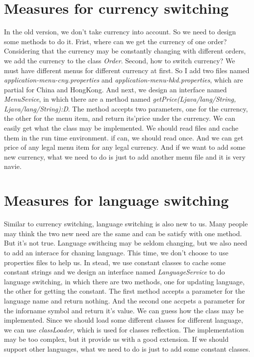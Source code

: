 \documentclass[a4paper]{report}
\begin{document}
\section{Measures for currency switching}
\par In the old version, we don't take currency into account. So we need to design some methods to do it. Frist, where can we get the currency of one order? Considering that the currency may be constantly changing with different orders, we add the currency to the class \emph{Order}. Second, how to switch currency? We must have different menus for different currency at first. So I add two files named \emph{application-menu-cny.properties} and \emph{application-menu-hkd.properties}, which are partial for China and HongKong. And next, we design an interface named \emph{MenuSevice}, in which there are a method named \emph{getPrice(Ljava/lang/String, Ljava/lang/String):D}. The method accepts two parameters, one for the currency, the other for the menu item, and return its'price under the currency. We can easily get what the class may be implemented. We should read files and cache them in the run time environment. if can, we should read once. And we can get price of any legal menu item for any legal currency. And if we want to add some new currency, what we need to do is just to add another menu file and it is very navie.
\section{Measures for language switching}
\par Similar to currency switching, language switching is also new to us. Many people may think the two new need are the same and can be satisfy with one method. But it's not true. Language swithcing may be seldom changing, but we also need to add an interace for chaning language. This time, we don't choose to use properties files to help us. In stead, we use constant classes to cache some constant strings and we design an interface named \emph{LanguageService} to do language switching, in which there are two methods, one for updating language, the other for getting the constant. The first method accepts a parameter for the language name and return nothing. And the second one accpets a parameter for the inforname symbol and return it's value. We can guess how the class may be implemented. Since we should load some different classes for different language, we can use \emph{classLoader}, which is used for classes reflection. The implementation may be too complex, but it provide us with a good extension. If we should support other languages, what we need to do is just to add some constant classes.
\end{document}
